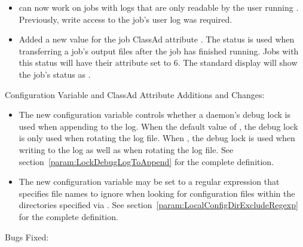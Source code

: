 \begin{itemize}
\item {} can now work on jobs with logs that are only
  readable by the user running .  Previously, write
  access to the job's user log was required.

\item Added a new value for the job ClassAd attribute .
The  status is used
when transferring a job's output files after the job has finished running.
Jobs with this status will have their  attribute set to 6.
The standard  display will show the job's status as \Expr{>}.

\end{itemize}

\noindent Configuration Variable and ClassAd Attribute Additions and Changes:

\begin{itemize}

\item The new configuration variable 
controls whether a daemon's debug lock is used when appending to the log.
When the default value of ,
the debug lock is only used when rotating the log file.
When , the debug lock is used when writing to
the log as well as when rotating the log file.
See section~\ref{param:LockDebugLogToAppend} for the complete definition.

\item The new configuration variable
   may be set to a regular
  expression that specifies file names to ignore when looking for
  configuration files within the directories specified via
  .  
  See section~\ref{param:LocalConfigDirExcludeRegexp} for the 
  complete definition.

\end{itemize}

\noindent Bugs Fixed:

